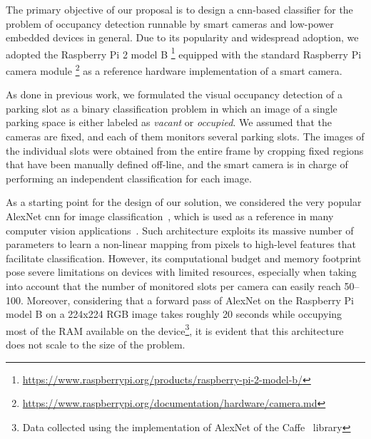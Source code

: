 The primary objective of our proposal is to design a \gls{cnn}-based classifier for the problem of occupancy detection runnable by smart cameras and low-power embedded devices in general.
Due to its popularity and widespread adoption, we adopted the Raspberry Pi 2 model B \footnote{\url{https://www.raspberrypi.org/products/raspberry-pi-2-model-b/}} equipped with the standard Raspberry Pi camera module \footnote{\url{https://www.raspberrypi.org/documentation/hardware/camera.md}} as a reference hardware implementation of a smart camera.

As done in previous work, we formulated the visual occupancy detection of a parking slot as a binary classification problem in which an image of a single parking space is either labeled as \emph{vacant} or \emph{occupied}.
We assumed that the cameras are fixed, and each of them monitors several parking slots.
The images of the individual slots were obtained from the entire frame by cropping fixed regions that have been manually defined off-line, and the smart camera is in charge of performing an independent classification for each image.

As a starting point for the design of our solution, we considered the very popular AlexNet \gls{cnn} for image classification~\cite{krizhevsky2012imagenet}, which is used as a reference in many computer vision applications~\cite{}.
Such architecture exploits its massive number of parameters to learn a non-linear mapping from pixels to high-level features that facilitate classification.
However, its computational budget and memory footprint pose severe limitations on devices with limited resources, especially when taking into account that the number of monitored slots per camera can easily reach 50--100.
Moreover, considering that a forward pass of AlexNet on the Raspberry Pi model B on a 224x224 RGB image takes roughly 20 seconds while occupying most of the RAM available on the device\footnote{Data collected using the implementation of AlexNet of the Caffe~\cite{jia2014caffe} library}, it is evident that this architecture does not scale to the size of the problem.

